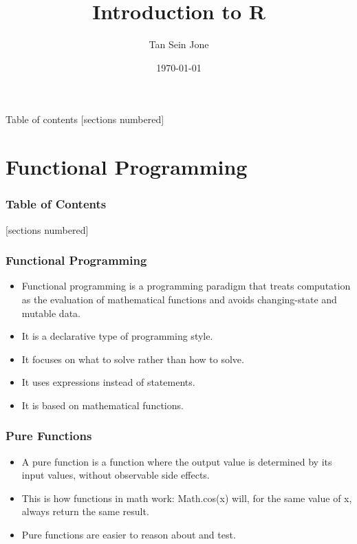 \documentclass[serif, 9pt, aspectratio=32]{beamer}
\title{Introduction to R}
\date{\today}
\author{Tan Sein Jone}
\institute{University of British Columbia}
\begin{document}
\maketitle

\begin{frame}{Table of contents}
    [sections numbered]
    \tableofcontents[hideallsubsections]
\end{frame}

\section{Functional Programming}

\begin{frame}
    \frametitle{Table of Contents}
    [sections numbered]
    \tableofcontents[currentsection]
\end{frame}

\begin{frame}
    \frametitle{Functional Programming}
    \begin{itemize}
        \item Functional programming is a programming paradigm that treats computation as the evaluation of mathematical functions and avoids changing-state and mutable data.
        \item It is a declarative type of programming style.
        \item It focuses on what to solve rather than how to solve.
        \item It uses expressions instead of statements.
        \item It is based on mathematical functions.
    \end{itemize}
\end{frame}

\begin{frame}
    \centering
    \frametitle{Pure Functions}
    \begin{itemize}
        \setlength{\itemsep}{2em}
        \item A pure function is a function where the output value is determined by its input values, without observable side effects.
        \item This is how functions in math work: Math.cos(x) will, for the same value of x, always return the same result.
        \item Pure functions are easier to reason about and test.
    \end{itemize}
\end{frame}
\end{document}
